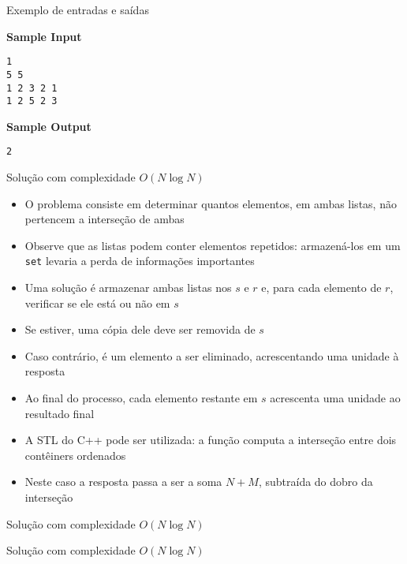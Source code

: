 \begin{frame}[fragile]{Exemplo de entradas e saídas}

\begin{minipage}[t]{0.6\textwidth}
\textbf{Sample Input}
\begin{verbatim}
1
5 5
1 2 3 2 1
1 2 5 2 3
\end{verbatim}
\end{minipage}
\begin{minipage}[t]{0.35\textwidth}
\textbf{Sample Output}
\begin{verbatim}
2
\end{verbatim}
\end{minipage}
\end{frame}

\begin{frame}[fragile]{Solução com complexidade $O(N\log N)$}

    \begin{itemize}
        \item O problema consiste em determinar quantos elementos, em ambas listas, não
            pertencem a interseção de ambas

        \item Observe que as listas podem conter elementos repetidos: armazená-los em um
            \texttt{set} levaria a perda de informações importantes

        \item Uma solução é armazenar ambas listas nos  $s$ e $r$ e, para
            cada elemento de $r$, verificar se ele está ou não em $s$

        \item Se estiver, uma cópia dele deve ser removida de $s$

        \item Caso contrário, é um elemento a ser eliminado, acrescentando uma unidade à resposta

        \item Ao final do processo, cada elemento restante em $s$ acrescenta uma unidade ao
            resultado final

        \item A STL do C++ pode ser utilizada: a função  computa
            a interseção entre dois contêiners ordenados

        \item Neste caso a resposta passa a ser a soma $N + M$, subtraída do dobro da interseção
   \end{itemize}

\end{frame}

\begin{frame}[fragile]{Solução com complexidade $O(N\log N)$}
\end{frame}

\begin{frame}[fragile]{Solução com complexidade $O(N\log N)$}
\end{frame}
